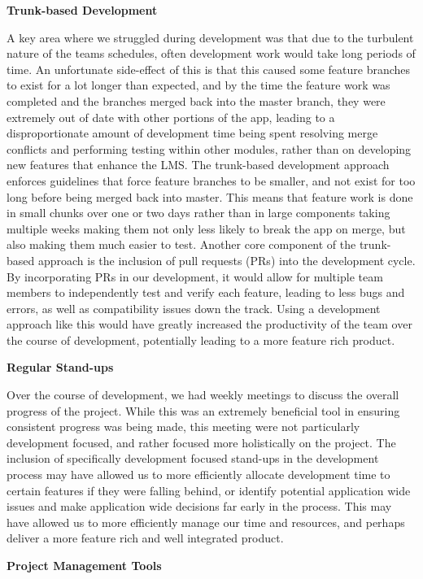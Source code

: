\textbf{Trunk-based Development}

A key area where we struggled during development was that due to the turbulent nature of the teams schedules, often development work would take long periods of time. An unfortunate side-effect of this is that this caused some feature branches to exist for a lot longer than expected, and by the time the feature work was completed and the branches merged back into the master branch, they were extremely out of date with other portions of the app, leading to a disproportionate amount of development time being spent resolving merge conflicts and performing testing within other modules, rather than on developing new features that enhance the LMS. The trunk-based development approach \cite{trunk} enforces guidelines that force feature branches to be smaller, and not exist for too long before being merged back into master. This means that feature work is done in small chunks over one or two days rather than in large components taking multiple weeks making them not only less likely to break the app on merge, but also making them much easier to test. Another core component of the trunk-based approach is the inclusion of pull requests (PRs) into the development cycle. By incorporating PRs in our development, it would allow for multiple team members to independently test and verify each feature, leading to less bugs and errors, as well as compatibility issues down the track. Using a development approach like this would have greatly increased the productivity of the team over the course of development, potentially leading to a more feature rich product.

\textbf{Regular Stand-ups}

Over the course of development, we had weekly meetings to discuss the overall progress of the project. While this was an extremely beneficial tool in ensuring consistent progress was being made, this meeting were not particularly development focused, and rather focused more holistically on the project. The inclusion of specifically development focused stand-ups in the development process may have allowed us to more efficiently allocate development time to certain features if they were falling behind, or identify potential application wide issues and make application wide decisions far early in the process. This may have allowed us to more efficiently manage our time and resources, and perhaps deliver a more feature rich and well integrated product.

\textbf{Project Management Tools}

